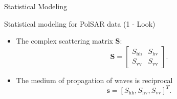 \documentclass[10pt]{beamer}
\begin{document}

\begin{frame}[fragile]{Statistical Modeling}
\begin{alertblock}{Statistical modeling for PolSAR data (1 - Look)}
\begin{itemize}
\item The complex scattering matrix $\mathbf{S}$:
\begin{equation}
\mathbf{S} = \left[
\begin{array}{cc}
	S_\text{hh}   & S_\text{hv}   \\
	S_\text{vv}   & S_\text{vv}   
\end{array}
\right].
\end{equation}\label{eq_01}
\item The medium of propagation of waves is reciprocal
$$\mathbf{s}=[S_\text{hh},S_\text{hv},S_{\text{vv}}]^T.$$
\end{itemize}
\end{alertblock}
\end{frame}
\end{document}
